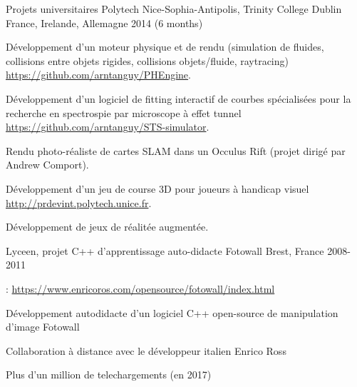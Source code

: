 \begin{cventries}
  \cventry
    {Projets universitaires} %
    {Polytech Nice-Sophia-Antipolis, Trinity College Dublin} %
    {France, Irelande, Allemagne} %
    {2014 (6 months)} %
    {
      \begin{cvitems} %
        \item Développement d'un moteur physique et de rendu (simulation de fluides, collisions entre objets rigides, collisions objets/fluide, raytracing)\\\url{https://github.com/arntanguy/PHEngine}.
        \item Développement d'un logiciel de fitting interactif de courbes spécialisées pour la recherche en spectrospie par microscope à effet tunnel\\\url{https://github.com/arntanguy/STS-simulator}. 
        \item Rendu photo-réaliste de cartes SLAM dans un Occulus Rift (projet dirigé par Andrew Comport).
        \item Développement d'un jeu de course 3D pour joueurs à handicap visuel\\\url{http://prdevint.polytech.unice.fr}. 
        \item Développement de jeux de réalitée augmentée.
      \end{cvitems}
    }

  \cventry
    {Lyceen, projet C++ d'apprentissage auto-didacte} %
    {Fotowall} %
    {Brest, France} %
    {2008-2011} %
    {
      \begin{cvitems} %
        \item {}: \url{https://www.enricoros.com/opensource/fotowall/index.html}
        \item Développement autodidacte d'un logiciel C++ open-source de manipulation d'image Fotowall
        \item Collaboration à distance avec le développeur italien Enrico Ross
        \item Plus d'un million de telechargements (en 2017)
      \end{cvitems}
    }

\end{cventries}
